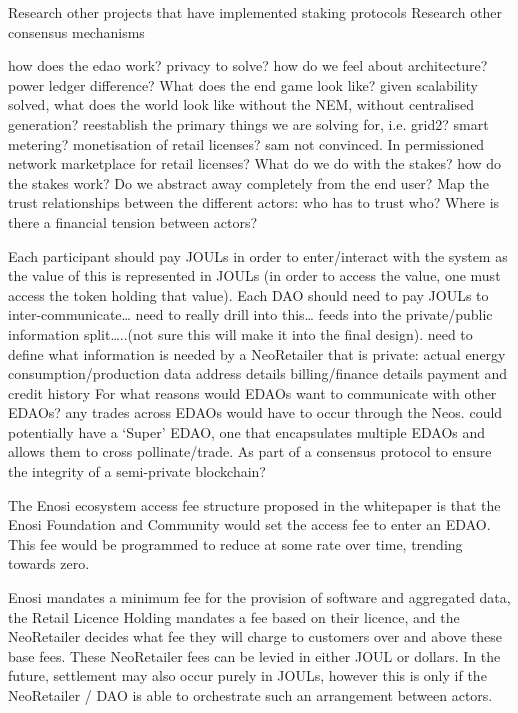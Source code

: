 \documentclass{article}
\theoremstyle{definition}
\theoremstyle{plain} %
\begin{document}
Research other projects that have implemented staking protocols
Research other consensus mechanisms

how does the edao work?
privacy to solve?
how do we feel about architecture?
power ledger difference?
What does the end game look like? given scalability solved, what does the world look like without the NEM, without centralised generation? 
reestablish the primary things we are solving for, i.e. grid2?
smart metering? 
monetisation of retail licenses? sam not convinced. In permissioned network
marketplace for retail licenses?
What do we do with the stakes? how do the stakes work? 
Do we abstract away completely from the end user? 
Map the trust relationships between the different actors: who has to trust who? Where is there a financial tension between actors? 




Each participant should pay JOULs in order to enter/interact with the system as the value of this is represented in JOULs (in order to access the value, one must access the token holding that value).
Each DAO should need to pay JOULs to inter-communicate… need to really drill into this… feeds into the private/public information split…..(not sure this will make it into the final design).
need to define what information is needed by a NeoRetailer that is private:
actual energy consumption/production data
address details
billing/finance details
payment and credit history
For what reasons would EDAOs want to communicate with other EDAOs?
any trades across EDAOs would have to occur through the Neos.
could potentially have a ‘Super’ EDAO, one that encapsulates multiple EDAOs and allows them to cross pollinate/trade.
As part of a consensus protocol to ensure the integrity of a semi-private blockchain?

The Enosi ecosystem access fee structure proposed in the whitepaper is that the Enosi Foundation and Community would set the access fee to enter an EDAO. This fee would be programmed to reduce at some rate over time, trending towards zero. 

Enosi mandates a minimum fee for the provision of software and aggregated data, the Retail Licence Holding mandates a fee based on their licence, and the NeoRetailer decides what fee they will charge to customers over and above these base fees. These NeoRetailer fees can be levied in either JOUL or dollars. In the future, settlement may also occur purely in JOULs, however this is only if the NeoRetailer / DAO is able to orchestrate such an arrangement between actors.
\end{document}
